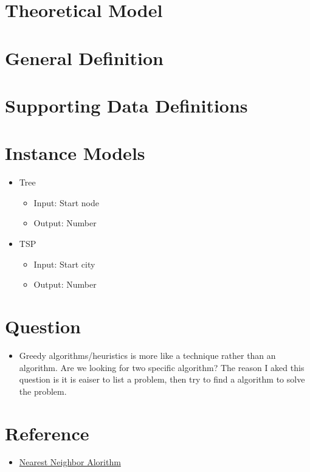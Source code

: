 \documentclass[12pt]{article}
\begin{document}
\section{Theoretical Model}
\section{General Definition}
\section{Supporting Data Definitions}

\section{Instance Models}
\begin{itemize}
    \item Tree
    \begin{itemize}
        \item Input: Start node
        \item Output: Number
    \end{itemize}
    \item TSP
    \begin{itemize}
        \item Input: Start city
        \item Output: Number
    \end{itemize}
\end{itemize}

\section{Question}
\begin{itemize}
    \item Greedy algorithms/heuristics is more like a technique rather than an algorithm. Are we looking for two 
    specific algorithm? The reason I aked this question is it is eaiser to list a problem, then try to find a algorithm 
    to solve the problem. 
\end{itemize}

\section{Reference}
\begin{itemize}
    \item \href{http://math.mit.edu/~goemans/18433S15/TSP-CookCPS.pdf}{Nearest Neighbor Alorithm} 
\end{itemize}
\end{document}
